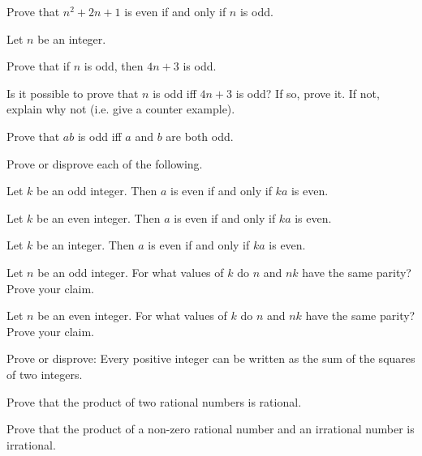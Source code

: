 \begin{pro}
Prove that $n^2+2n+1$ is even if and only if $n$ is odd.
\end{pro}

\begin{pro}
Let $n$ be an integer.
\begin{lenum}
\item
Prove that if $n$ is odd, then $4n+3$ is odd.
\item
Is it possible to prove that $n$ is odd iff $4n+3$ is odd?  If so, prove it.  
If not, explain why not (i.e. give a counter example).
\end{lenum}
\end{pro}



\begin{pro}
Prove that $ab$ is odd iff $a$ and $b$ are both odd.
\end{pro}

\begin{pro}
Prove or disprove each of the following.
\begin{lenum}
\item
Let $k$ be an odd integer. Then $a$ is even if and only if $k a$ is even.
\item
Let $k$ be an even integer. Then $a$ is even if and only if $k a$ is even.
\item
Let $k$ be an integer. Then $a$ is even if and only if $k a$ is even.
\end{lenum}
\end{pro}

\begin{pro}
Let $n$ be an odd integer. For what values of $k$ do $n$ and $n k$ have the same parity?
Prove your claim.
\end{pro}

\begin{pro}
Let $n$ be an even integer. For what values of $k$ do $n$ and $n k$ have the same parity?
Prove your claim.
\end{pro}

\begin{pro}
Prove or disprove: Every positive integer can be written as the
sum of the squares of two integers.
\end{pro}

\begin{pro}
Prove that the product of two rational numbers is rational.
\end{pro}

\begin{pro}
Prove that the product of a non-zero rational number and an irrational number is
irrational.
\end{pro}


